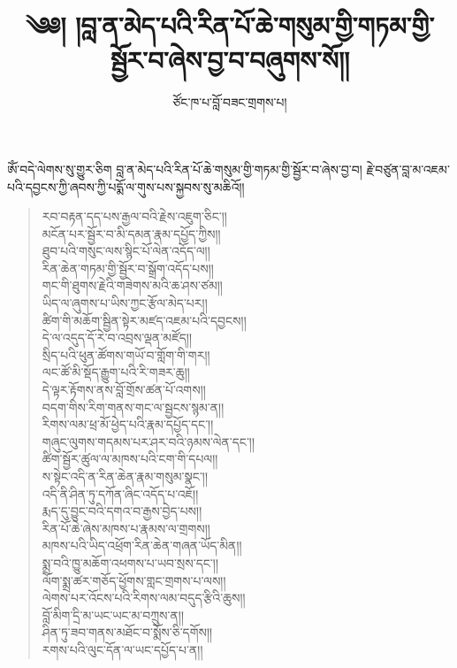 \documentclass{article}
\title{༄༅། །བླ་ན་མེད་པའི་རིན་པོ་ཆེ་གསུམ་གྱི་གཏམ་གྱི་སྦྱོར་བ་ཞེས་བྱ་བ་བཞུགས་སོ།།}
\author{ཙོང་ཁ་པ་བློ་བཟང་གྲགས་པ།}
\date{}
\begin{document}
\maketitle

ཨོཾ་བདེ་ལེགས་སུ་གྱུར་ཅིག
བླ་ན་མེད་པའི་རིན་པོ་ཆེ་གསུམ་གྱི་གཏམ་གྱི་སྦྱོར་བ་ཞེས་བྱ་བ།
རྗེ་བཙུན་བླ་མ་འཇམ་པའི་དབྱངས་ཀྱི་ཞབས་ཀྱི་པདྨོ་ལ་གུས་པས་སྐྱབས་སུ་མཆིའོ།།

\begin{verse}
    རབ་བརྟན་དད་པས་རྒྱལ་བའི་རྗེས་འཇུག་ཅིང༌།། \\
    མངོན་པར་སྦྱོར་བ་མི་དམན་རྣམ་དཔྱོད་ཀྱིས།། \\
    ཐུབ་པའི་གསུང་ལས་སྙིང་པོ་ལེན་འདོད་ལ།། \\
    རིན་ཆེན་གཏམ་གྱི་སྦྱོར་བ་སྒྲོག་འདོད་པས།། \\
    གང་གི་ཐུགས་རྗེའི་གཟེགས་མའི་ཆ་ཤས་ཙམ།། \\
    ཡིད་ལ་ཞུགས་པ་ཡིས་ཀྱང་རྩོལ་མེད་པར།། \\
    ཚིག་གི་མཆོག་སྦྱིན་སྟེར་མཛད་འཇམ་པའི་དབྱངས།། \\
    དེ་ལ་འདུད་དོ་རེ་བ་འབྲས་ལྡན་མཛོད།། \\
    སྲིད་པའི་ཕུན་ཚོགས་གཡོ་བ་གློག་གི་གར།། \\
    ལང་ཚོ་མི་སྡོད་རྒྱུག་པའི་རི་གཟར་ཆུ།། \\
    དེ་ལྟར་རྟོགས་ནས་བློ་གྲོས་ཚན་པོ་འགས།། \\
    བདག་གིས་རིག་གནས་གང་ལ་སྦྱངས་སྙམ་ན།། \\
    རིགས་ལམ་ཕྲ་མོ་ཕྱེད་པའི་རྣམ་དཔྱོད་དང༌།། \\
    གཞུང་ལུགས་གདམས་པར་ཤར་བའི་ཉམས་ལེན་དང༌།། \\
    ཚིག་སྦྱོར་ཚུལ་ལ་མཁས་པའི་ངག་གི་དཔལ།། \\
    ས་སྟེང་འདི་ན་རིན་ཆེན་རྣམ་གསུམ་སྣང༌།། \\
    འདི་ནི་ཤིན་ཏུ་དཀོན་ཞིང་འདོད་པ་འཇོ།། \\
    རྨད་དུ་བྱུང་བའི་དགའ་བ་རྒྱས་བྱེད་པས།། \\
    རིན་པོ་ཆེ་ཞེས་མཁས་པ་རྣམས་ལ་གྲགས།། \\
    མཁས་པའི་ཡིད་འཕྲོག་རིན་ཆེན་གཞན་ཡོད་མིན།། \\
    སྨྲ་བའི་ཁྱུ་མཆོག་འཕགས་པ་ཡབ་སྲས་དང༌།། \\
    ལོག་སྨྲ་ཚར་གཅོད་ཕྱོགས་གླང་གྲགས་པ་ལས།། \\
    ལེགས་པར་འོངས་པའི་རིགས་ལམ་བདུད་རྩིའི་ཆུས།། \\
    བློ་མིག་དྲི་མ་ཡང་ཡང་མ་བཀྲུས་ན།། \\
    ཤིན་ཏུ་ཟབ་གནས་མཐོང་བ་སྨོས་ཅི་དགོས།། \\
    རགས་པའི་ལུང་དོན་ལ་ཡང་དཔྱོད་པ་ན།། \\

\end{verse}
\end{document}
